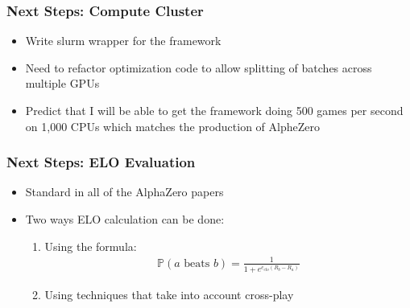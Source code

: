 \documentclass{beamer}
\begin{document}


\begin{frame}
  \frametitle{Next Steps: Compute Cluster}

  \begin{itemize}
    \item Write slurm wrapper for the framework
    \item Need to refactor optimization code to allow splitting of batches across multiple GPUs
    \item Predict that I will be able to get the framework doing 500 games per second on 1,000 CPUs which matches the production of AlpheZero
  \end{itemize}
\end{frame}



\begin{frame}
  \frametitle{Next Steps: ELO Evaluation}

  \begin{itemize}
    \item Standard in all of the AlphaZero papers
    \item Two ways ELO calculation can be done:
      \begin{enumerate}
        \item Using the formula:
          \begin{gather*}
            \mathbb{P}(a \text{ beats } b) = \frac{1}{1 + e^{c_{elo} (R_b - R_a)}}
          \end{gather*}
        \item Using techniques that take into account cross-play
      \end{enumerate}
  \end{itemize}
\end{frame}


\end{document}
